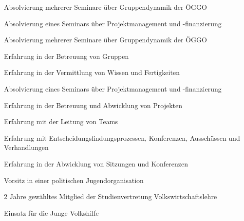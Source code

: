 



	{\begin{cvenumerate}
		\item Absolvierung mehrerer Seminare über Gruppendynamik der ÖGGO
		\item Absolvierung eines Seminars über Projektmanagement und -finanzierung
	\end{cvenumerate}}

	{\begin{cvenumerate}
		\item Absolvierung mehrerer Seminare über Gruppendynamik der ÖGGO
		\item Erfahrung in der Betreuung von Gruppen
		\item Erfahrung in der Vermittlung von Wissen und Fertigkeiten
	\end{cvenumerate}}

	{\begin{cvenumerate}
		\item Absolvierung eines Seminars über Projektmanagement und -finanzierung
		\item Erfahrung in der Betreuung und Abwicklung von Projekten
		\item Erfahrung mit der Leitung von Teams
		\item Erfahrung mit Entscheidungsfindungsprozessen, Konferenzen, Ausschüssen und Verhandlungen
		\item Erfahrung in der Abwicklung von Sitzungen und Konferenzen
	\end{cvenumerate}}
	
	{\begin{cvenumerate}
		\item Vorsitz in einer politischen Jugendorganisation
		\item 2 Jahre gewähltes Mitglied der Studienvertretung Volkswirtschaftslehre
		\item Einsatz für die Junge Volkshilfe
	\end{cvenumerate}}

